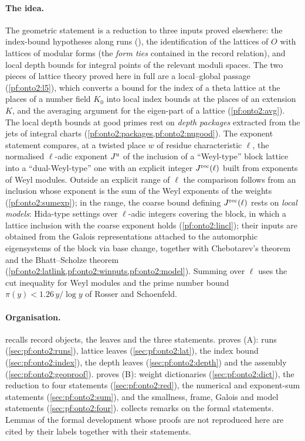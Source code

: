 \paragraph{The idea.} The geometric statement is a reduction to three inputs proved elsewhere: the index-bound
hypotheses along runs (), the identification of the lattices of
$O$ with lattices of modular forms (the \emph{form ties} contained in the record relation), and local depth bounds for
integral points of the relevant moduli spaces. The two pieces of lattice theory proved here in full are a
local--global passage (\cref{pf:onto2:l5}), which converts a bound for the index of a theta lattice at the places of a
number field $K_0$ into local index bounds at the places of an extension $K$, and the averaging argument for the
eigen-part of a lattice (\cref{pf:onto2:avg}). The local depth bounds at good primes rest on \emph{depth packages} extracted
from the jets of integral charts (\cref{pf:onto2:packages,pf:onto2:nugood}). The exponent statement compares, at a twisted place $w$ of residue
characteristic $\ell$, the normalised $\ell$-adic exponent $J^{\mathrm{u}}$ of the inclusion of a ``Weyl-type'' block lattice
into a ``dual-Weyl-type'' one with an explicit integer $J^{\mathrm{rec}}(\ell)$ built from exponents of Weyl modules. Outside an
explicit range of $\ell$ the comparison follows from an inclusion whose exponent is the sum of the Weyl exponents of the weights
(\cref{pf:onto2:sumexp}); in the range, the coarse bound defining $J^{\mathrm{rec}}(\ell)$ rests
on \emph{local models}: Hida-type settings over $\ell$-adic integers covering the block, in which a lattice inclusion with the coarse
exponent holds (\cref{pf:onto2:lincl}); their inputs are obtained from the Galois representations attached to the automorphic
eigensystems of the block via base change, together with Chebotarev's theorem and the Bhatt--Scholze theorem
(\cref{pf:onto2:latlink,pf:onto2:winputs,pf:onto2:model}). Summing over $\ell$ uses the cut inequality for Weyl
modules and the prime number bound $\pi(y)<1.26\,y/\log y$ of Rosser and Schoenfeld.

\paragraph{Organisation.}  recalls record objects, the leaves and the three statements.
 proves (A): runs (\cref{sec:pf:onto2:runs}), lattice leaves (\cref{sec:pf:onto2:lat}), the
index bound (\cref{sec:pf:onto2:index}), the depth leaves (\cref{sec:pf:onto2:depth}) and the assembly
(\cref{sec:pf:onto2:geoproof}).  proves (B): weight dictionaries (\cref{sec:pf:onto2:dict}), the
reduction to four statements (\cref{sec:pf:onto2:red}), the numerical and exponent-sum statements
(\cref{sec:pf:onto2:sum}), and the smallness, frame, Galois and model statements (\cref{sec:pf:onto2:four}).
 collects remarks on the formal statements. Lemmas of the formal development whose proofs
are not reproduced here are cited by their labels together with their statements.

